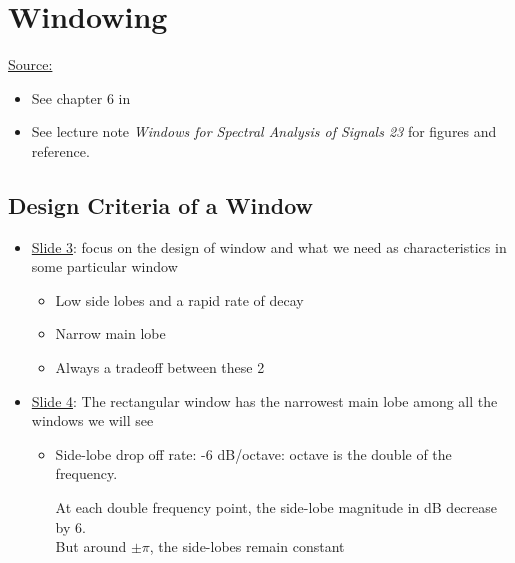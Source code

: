 \chapter{Windowing}

\underline{Source:} 

\begin{itemize}

    \item See chapter 6 in \cite{book_a_course_in_DSP_Porat}

    \item See lecture note \textit{Windows for Spectral Analysis of Signals 23} for figures and reference.
\end{itemize}



\section{Design Criteria of a Window}

\begin{itemize}

\item \underline{Slide 3}: focus on the design of window and what we need as characteristics in some particular window

\begin{itemize}
    \item Low side lobes and a rapid rate of decay
    
    \item Narrow main lobe
    
    
    \item Always a tradeoff between these 2
    
\end{itemize}


\item \underline{Slide 4}: The rectangular window has the narrowest main lobe among all the windows we will see

\begin{itemize}
    \item Side-lobe drop off rate: -6 dB/octave: octave is the double of the frequency.
    
    At each double frequency point, the side-lobe magnitude in dB decrease by 6.\\
    
    But around $\pm \pi$, the side-lobes remain constant

    
\end{itemize}

\end{itemize}


